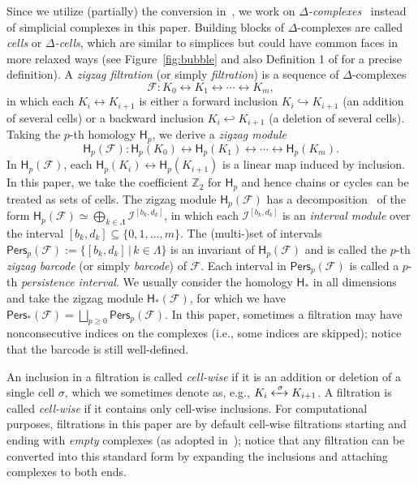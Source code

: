 \documentclass[letterpaper,11pt]{article}
\theoremstyle{mythmstyle}
\theoremstyle{mydefstyle}
\theoremstyle{plain}
\theoremstyle{definition}
\newcommand{\Hm}{\mathsf{H}}
\newcommand{\Pers}{\mathsf{Pers}}
\newcommand{\<}[1]{\langle #1\rangle}
\newcommand{\lbarrowspace}{\;}
\newcommand{\lrarrowsp}[1]{\xleftrightarrow{\lbarrowspace#1\lbarrowspace}}
\let\leftrightarrowsp\lrarrowsp
\newcommand{\incto}{\hookrightarrow}
\newcommand{\bakincto}{\hookleftarrow}
\newcommand{\given}{\,|\,}
\newcommand{\Set}[1]{\{#1\}}
\newcommand{\Fcal}{\mathcal{F}}
\newcommand{\Ical}{\mathcal{I}}
\newcommand{\Zbb}{\mathbb{Z}}
\newcommand{\DG}{\Delta}
\newcommand{\LG}{\Lambda}
\newcommand{\sG}{\sigma}
\newcommand{\Dim}{p}
\newcommand{\birth}{b}
\newcommand{\death}{d}
\newcommand{\filtcnt}{m}
\begin{document}
Since we utilize (partially) the conversion in~\cite{dey2022fast},
we work on \emph{$\DG$-complexes}~\cite{79945ceb-9a4c-3c90-a4ac-148c36996187,hatcher2002algebraic} 
instead of simplicial complexes
in this paper.
Building blocks of $\DG$-complexes are
called \emph{cells} or \emph{$\DG$-cells},
which are similar to simplices
but could have common faces in more
relaxed ways (see Figure~\ref{fig:bubble}
and also Definition 1 of \cite{dey2022fast} for a precise definition).
A {\it zigzag filtration} (or simply {\it filtration})
is  a sequence of $\DG$-complexes
\begin{equation}
\label{eqn:prelim-filt}
\Fcal: K_0 \leftrightarrow K_1 \leftrightarrow 
\cdots \leftrightarrow K_\filtcnt,
\end{equation}
in which each
$K_i\leftrightarrow K_{i+1}$ is either a forward inclusion $K_i\incto K_{i+1}$
(an addition of several cells)
or a backward inclusion $K_i\bakincto K_{i+1}$
(a deletion of several cells).
Taking the $\Dim$-th homology $\Hm_\Dim$,
we derive a {\it zigzag module}
\[
\Hm_\Dim(\Fcal): 
\Hm_\Dim(K_0) 
\leftrightarrow
\Hm_\Dim(K_1) 
\leftrightarrow
\cdots 
\leftrightarrow
\Hm_\Dim(K_\filtcnt). \]
In $\Hm_\Dim(\Fcal)$,
each $\Hm_\Dim(K_i)\leftrightarrow \Hm_\Dim(K_{i+1})$
is a linear map induced by inclusion.
In this paper, we take the coefficient $\Zbb_2$ for $\Hm_\Dim$
and hence  chains or cycles can be treated
as sets of cells.
The zigzag module $\Hm_\Dim(\Fcal)$
has a decomposition~\cite{carlsson2010zigzag,Gabriel72} of the form
$\Hm_\Dim(\Fcal)\simeq\bigoplus_{k\in\LG}\Ical^{[\birth_k,\death_k]}$,
in which each $\Ical^{[\birth_k,\death_k]}$
is an
{\it interval module} over the interval $[\birth_k,\death_k]\subseteq\Set{0,1,\ldots,\filtcnt}$.
The (multi-)set of intervals
$\Pers_\Dim(\Fcal):=\Set{[\birth_k,\death_k]\given k\in\LG}$
is an invariant of $\Hm_\Dim(\Fcal)$
and is called the $\Dim$-th {\it zigzag barcode} (or simply {\it barcode}) of $\Fcal$.
Each interval in $\Pers_\Dim(\Fcal)$
is called a $\Dim$-th \emph{persistence interval}.
We usually consider the homology $\Hm_*$ in all dimensions
and take the zigzag module $\Hm_*(\Fcal)$,
for which we have $\Pers_*(\Fcal)=\bigsqcup_{\Dim\geq 0}\Pers_\Dim(\Fcal)$.
In this paper,
sometimes a filtration may have nonconsecutive indices
on the complexes (i.e., some indices are skipped);
notice that the barcode is still well-defined.

An inclusion in a filtration is called \emph{cell-wise}
if it is an addition or deletion of a single cell $\sG$,
which we sometimes denote as, e.g., $K_i\leftrightarrowsp{\sG}K_{i+1}$.
A filtration is called \emph{cell-wise} if it contains only cell-wise inclusions.
For computational purposes, 
filtrations in this paper are by default
cell-wise filtrations
starting and ending with \emph{empty} complexes
(as adopted in~\cite{dey2022fast,maria2014zigzag});
notice that any filtration can be converted into this  standard form
by expanding the inclusions and attaching complexes to both ends.
\end{document}
